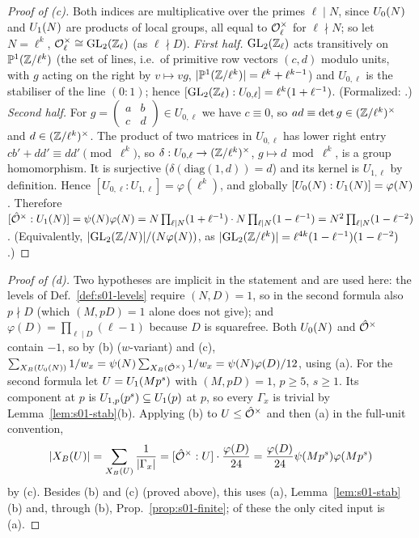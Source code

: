 \begin{proof}[Proof of (c)]
Both indices are multiplicative over the primes $\ell\mid N$, since $U_0(N)$ and $U_1(N)$ are products of local groups,
all equal to $\mathcal{O}_\ell^\times$ for $\ell\nmid N$; so let $N=\ell^k$, $\mathcal{O}_\ell^\times\cong\mathrm{GL}_2(\mathbb{Z}_\ell)$ (as $\ell\nmid D$).
\emph{First half.} $\mathrm{GL}_2(\mathbb{Z}_\ell)$ acts transitively on $\mathbb P^1(\mathbb{Z}/\ell^k)$ (the set of lines, i.e.\ of
primitive row vectors $(c,d)$ modulo units, with $g$ acting on the right by $v\mapsto vg$, $|\mathbb P^1(\mathbb{Z}/\ell^k)|=\ell^k+\ell^{k-1}$) and $U_{0,\ell}$ is the stabiliser of the line $(0:1)$; hence
$[\mathrm{GL}_2(\mathbb{Z}_\ell):U_{0,\ell}]=\ell^k(1+\ell^{-1})$. (Formalized: .)
\emph{Second half.} For $g=\left(\begin{smallmatrix}a&b\\c&d\end{smallmatrix}\right)\in U_{0,\ell}$ we have $c\equiv0$, so
$ad\equiv\det g\in(\mathbb{Z}/\ell^k)^\times$ and $d\in(\mathbb{Z}/\ell^k)^\times$. The product of two matrices in $U_{0,\ell}$ has lower right
entry $cb'+dd'\equiv dd'\pmod{\ell^k}$, so $\delta:U_{0,\ell}\to(\mathbb{Z}/\ell^k)^\times$, $g\mapsto d\bmod\ell^k$, is a group homomorphism.
It is surjective ($\delta(\mathrm{diag}(1,d))=d$) and its kernel is $U_{1,\ell}$ by definition. Hence
$[U_{0,\ell}:U_{1,\ell}]=\varphi(\ell^k)$, and globally $[U_0(N):U_1(N)]=\varphi(N)$. Therefore
$[\hat{\mathcal{O}}^\times:U_1(N)]=\psi(N)\varphi(N)=N\prod_{\ell\mid N}(1+\ell^{-1})\cdot N\prod_{\ell\mid N}(1-\ell^{-1})=N^2\prod_{\ell\mid N}(1-\ell^{-2})$.
(Equivalently, $|\mathrm{GL}_2(\mathbb{Z}/N)|/(N\varphi(N))$, as $|\mathrm{GL}_2(\mathbb{Z}/\ell^k)|=\ell^{4k}(1-\ell^{-1})(1-\ell^{-2})$.)
\end{proof}

\begin{proof}[Proof of (d)]
Two hypotheses are implicit in the statement and are used here: the levels of Def.~\ref{def:s01-levels} require $(N,D)=1$,
so in the second formula also $p\nmid D$ (which $(M,pD)=1$ alone does not give); and $\varphi(D)=\prod_{\ell\mid D}(\ell-1)$
because $D$ is squarefree.
Both $U_0(N)$ and $\hat{\mathcal{O}}^\times$ contain $-1$, so by (b) ($w$-variant) and (c),
$\sum_{X_B(U_0(N))}1/w_x=\psi(N)\sum_{X_B(\hat{\mathcal{O}}^\times)}1/w_x=\psi(N)\varphi(D)/12$, using (a). For the second formula let $U=U_1(Mp^s)$ with
$(M,pD)=1$, $p\ge5$, $s\ge1$. Its component at $p$ is $U_{1,p}(p^s)\subseteq U_1(p)$ at $p$, so every $\Gamma_x$ is trivial by
Lemma~\ref{lem:s01-stab}(b). Applying (b) to $U\le\hat{\mathcal{O}}^\times$ and then (a) in the full-unit convention,
\[|X_B(U)|=\sum_{X_B(U)}\frac1{|\Gamma_x|}=[\hat{\mathcal{O}}^\times:U]\cdot\frac{\varphi(D)}{24}=\frac{\varphi(D)}{24}\psi(Mp^s)\varphi(Mp^s)\]
by (c). Besides (b) and (c) (proved above), this uses (a), Lemma~\ref{lem:s01-stab}(b) and, through (b),
Prop.~\ref{prop:s01-finite}; of these the only cited input is (a).
\end{proof}

